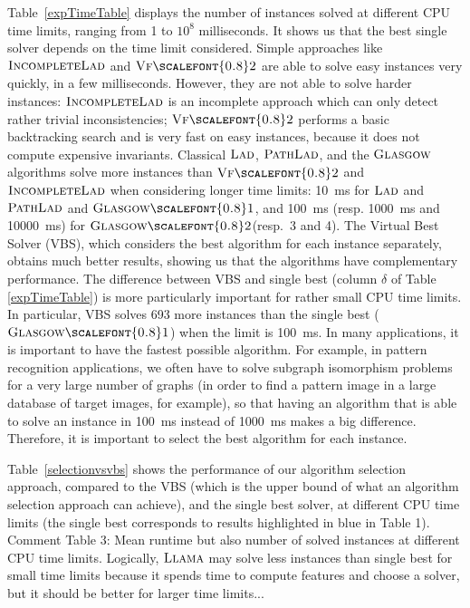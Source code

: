 \documentclass{llncs}
\newcommand{\VFtwo}{$\textsc{Vf{\scalefont{0.8}2}}$\xspace}
\newcommand{\Glasgow}{$\textsc{Glasgow}$\xspace}
\newcommand{\LAD}{$\textsc{Lad}$\xspace}
\newcommand{\IncompleteLAD}{$\textsc{IncompleteLad}$\xspace}
\newcommand{\PathLAD}{$\textsc{PathLad}$\xspace}
\newcommand{\GlasgowOne}{$\textsc{Glasgow{\scalefont{0.8}1}}$\xspace}
\newcommand{\GlasgowTwo}{$\textsc{Glasgow{\scalefont{0.8}2}}$\xspace}
\newcommand{\LLAMA}{$\textsc{Llama}$\xspace}
\begin{document}
Table~\ref{expTimeTable} displays the number of instances solved at different CPU time limits,
ranging from 1 to $10^8$ milliseconds. It shows us that the best single solver depends on the time
limit considered. Simple approaches like \IncompleteLAD and \VFtwo are able to solve easy instances
very quickly, in a few milliseconds. However, they are not able to solve harder instances:
\IncompleteLAD is an incomplete approach which can only detect rather trivial inconsistencies; \VFtwo
performs a basic backtracking search and is very fast on easy instances, because it does not compute
expensive invariants. Classical \LAD, \PathLAD, and the \Glasgow algorithms solve more instances than \VFtwo
and \IncompleteLAD when considering longer time limits: \SI{10}{\ms} for \LAD and \PathLAD and
\GlasgowOne, and \SI{100}{\ms} (resp. \SI{1000}{\ms} and \SI{10000}{\ms}) for \GlasgowTwo (resp.\ 3 and
4). The Virtual Best Solver (VBS), which considers the best algorithm for each instance separately,
obtains much better results, showing us that the algorithms have complementary performance. The
difference between VBS and single best (column $\delta$ of Table \ref{expTimeTable}) is more
particularly important for rather small CPU time limits. In particular, VBS solves 693 more
instances than the single best (\GlasgowOne) when the limit is \SI{100}{\ms}. In many applications,
it is important to have the fastest possible algorithm. For example, in pattern recognition
applications, we often have to solve subgraph isomorphism problems for a very large number of graphs
(in order to find a pattern image in a large database of target images, for example), so that having
an algorithm that is able to solve an instance in \SI{100}{\ms} instead of \SI{1000}{\ms} makes a
big difference. Therefore, it is important to select the best algorithm for each instance.

Table~\ref{selectionvsvbs} shows the performance of our algorithm selection approach, compared to
the VBS (which is the upper bound of what an algorithm selection approach can achieve), and the
single best solver, at different CPU time limits (the single best corresponds to results highlighted
in blue in Table 1).  Comment Table 3: Mean runtime but also number of solved instances at different
CPU time limits.  Logically, \LLAMA may solve less instances than single best for small time limits
because it spends time to compute features and choose a solver, but it should be better for larger
time limits...
\end{document}
